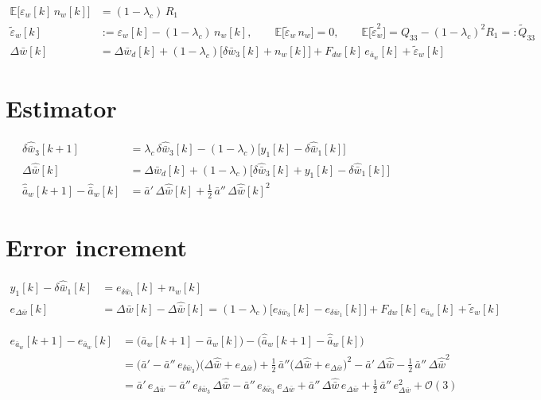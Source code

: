 \documentclass[11pt,a4paper,fontset=none]{ctexart}
\newcommand{\ba}{\bar{a}}
\newcommand{\bw}{\bar{w}}
\newcommand{\E}{\mathbb{E}}
\newcommand{\dW}{\Delta\bw}
\newcommand{\dWh}{\Delta\hat{\bw}}
\newcommand{\eD}{e_{\Delta\bw}}
\newcommand{\ap}{\ba'}
\newcommand{\app}{\ba''}
\newcommand{\et}{\tilde{\varepsilon}_w}
\begin{document}
\begin{align*}
\E\bigl[\varepsilon_w[k]\,n_w[k]\bigr] &= (1-\lambda_c)\,R_1 \\
\et[k] &:= \varepsilon_w[k] - (1-\lambda_c)\,n_w[k] , \qquad
\E\bigl[\et\,n_w\bigr] = 0 , \qquad
\E\bigl[\et^{2}\bigr] = Q_{33} - (1-\lambda_c)^{2}R_1 =: \tilde{Q}_{33} \\
\dW[k] &= \Delta\bw_d[k] + (1-\lambda_c)\bigl[\delta\bw_3[k] + n_w[k]\bigr] + F_{dw}[k]\,e_{\ba_w}[k] + \et[k]
\end{align*}

\section{Estimator}

\begin{align*}
\delta\hat{\bw}_3[k+1] &= \lambda_c\,\delta\hat{\bw}_3[k] - (1-\lambda_c)\bigl[y_1[k] - \delta\hat{\bw}_1[k]\bigr] \\
\dWh[k]                &= \Delta\bw_d[k] + (1-\lambda_c)\bigl[\delta\hat{\bw}_3[k] + y_1[k] - \delta\hat{\bw}_1[k]\bigr] \\
\hat{\ba}_w[k+1] - \hat{\ba}_w[k] &= \ap\,\dWh[k] + \tfrac{1}{2}\,\app\,\dWh[k]^{2}
\end{align*}

\clearpage
\section{Error increment}

\begin{align*}
y_1[k] - \delta\hat{\bw}_1[k] &= e_{\delta\bw_1}[k] + n_w[k] \\
\eD[k] &= \dW[k] - \dWh[k]
        = (1-\lambda_c)\bigl[e_{\delta\bw_3}[k] - e_{\delta\bw_1}[k]\bigr] + F_{dw}[k]\,e_{\ba_w}[k] + \et[k]
\end{align*}

\begin{align*}
e_{\ba_w}[k+1] - e_{\ba_w}[k]
  &= \bigl(\ba_w[k+1] - \ba_w[k]\bigr) - \bigl(\hat{\ba}_w[k+1] - \hat{\ba}_w[k]\bigr) \\
  &= \bigl(\ap - \app\,e_{\delta\bw_3}\bigr)\bigl(\dWh + \eD\bigr) + \tfrac{1}{2}\,\app\bigl(\dWh + \eD\bigr)^{2}
     - \ap\,\dWh - \tfrac{1}{2}\,\app\,\dWh^{2} \\
  &= \ap\,\eD
     - \app\,e_{\delta\bw_3}\,\dWh
     - \app\,e_{\delta\bw_3}\,\eD
     + \app\,\dWh\,\eD
     + \tfrac{1}{2}\,\app\,\eD^{2}
     + \mathcal{O}(3)
\end{align*}
\end{document}

